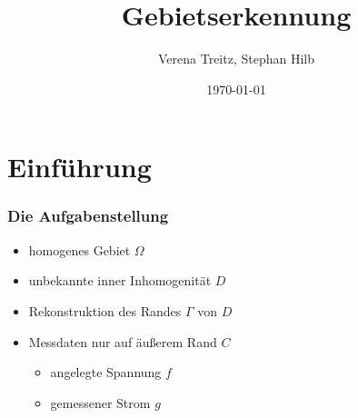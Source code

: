 \documentclass{beamer}
\title{Gebietserkennung}
\author{Verena Treitz, Stephan Hilb}
\date{\today}
\begin{document}
\begin{frame}
	\titlepage
\end{frame}

\section{Einführung}


\begin{frame}
	\frametitle{Die Aufgabenstellung}
	\begin{minipage}{0.60\textwidth}
		\begin{figure}
			\centering
		\end{figure}
	\end{minipage}
	\hfill
	\begin{minipage}{0.38\textwidth}
		\begin{itemize}
			\item \pause
				homogenes Gebiet $\Omega$
			\item
				unbekannte inner Inhomogenität $D$
			\item
				Rekonstruktion des Randes $\Gamma$ von $D$
			\item \pause
				Messdaten nur auf äußerem Rand $C$
				\begin{itemize}
					\item
						angelegte Spannung $f$
					\item
						gemessener Strom $g$
				\end{itemize}
		\end{itemize}
	\end{minipage}
\end{frame}
\end{document}
